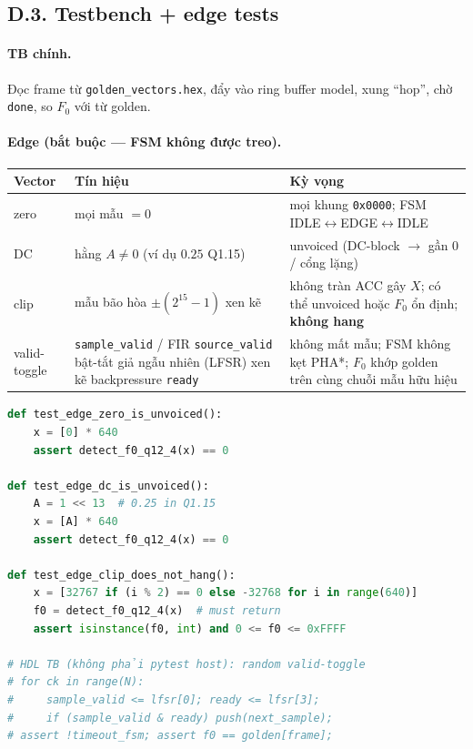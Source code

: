 \subsection*{D.3. Testbench + edge tests}

\paragraph{TB chính.} Đọc frame từ \texttt{golden\_vectors.hex}, đẩy vào ring buffer model, xung ``hop'', chờ \texttt{done}, so $F_0$ với từ golden.

\paragraph{Edge (bắt buộc --- FSM không được treo).}
\begin{center}
\small
\begin{tabular}{@{}lll@{}}
\toprule
Vector & Tín hiệu & Kỳ vọng \\
\midrule
zero & mọi mẫu $=0$ & mọi khung \texttt{0x0000}; FSM IDLE$\leftrightarrow$EDGE$\leftrightarrow$IDLE \\
DC & hằng $A\neq 0$ (ví dụ $0.25$ Q1.15) & unvoiced (DC-block $\to$ gần 0 / cổng lặng) \\
clip & mẫu bão hòa $\pm(2^{15}-1)$ xen kẽ & không tràn ACC gây $X$; có thể unvoiced hoặc $F_0$ ổn định; \textbf{không hang} \\
valid-toggle & \texttt{sample\_valid} / FIR \texttt{source\_valid} bật-tắt giả ngẫu nhiên (LFSR) xen kẽ backpressure \texttt{ready} & không mất mẫu; FSM không kẹt PHA*; $F_0$ khớp golden trên cùng chuỗi mẫu hữu hiệu \\
\bottomrule
\end{tabular}
\end{center}

\begin{lstlisting}[language=Python, caption={Ba vector cạnh bổ sung vào \texttt{test\_lab\_1\_3\_5.py} (rút gọn).}]
def test_edge_zero_is_unvoiced():
    x = [0] * 640
    assert detect_f0_q12_4(x) == 0

def test_edge_dc_is_unvoiced():
    A = 1 << 13  # 0.25 in Q1.15
    x = [A] * 640
    assert detect_f0_q12_4(x) == 0

def test_edge_clip_does_not_hang():
    x = [32767 if (i % 2) == 0 else -32768 for i in range(640)]
    f0 = detect_f0_q12_4(x)  # must return
    assert isinstance(f0, int) and 0 <= f0 <= 0xFFFF

# HDL TB (không phải pytest host): random valid-toggle
# for ck in range(N):
#     sample_valid <= lfsr[0]; ready <= lfsr[3];
#     if (sample_valid & ready) push(next_sample);
# assert !timeout_fsm; assert f0 == golden[frame];
\end{lstlisting}

